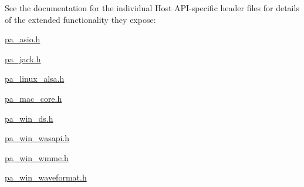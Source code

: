 See the documentation for the individual Host A\+P\+I-\/specific header files for details of the extended functionality they expose\+:


\begin{DoxyItemize}
\item \hyperlink{pa__asio_8h}{pa\+\_\+asio.\+h}
\item \hyperlink{pa__jack_8h}{pa\+\_\+jack.\+h}
\item \hyperlink{pa__linux__alsa_8h}{pa\+\_\+linux\+\_\+alsa.\+h}
\item \hyperlink{pa__mac__core_8h}{pa\+\_\+mac\+\_\+core.\+h}
\item \hyperlink{pa__win__ds_8h}{pa\+\_\+win\+\_\+ds.\+h}
\item \hyperlink{pa__win__wasapi_8h}{pa\+\_\+win\+\_\+wasapi.\+h}
\item \hyperlink{pa__win__wmme_8h}{pa\+\_\+win\+\_\+wmme.\+h}
\item \hyperlink{pa__win__waveformat_8h}{pa\+\_\+win\+\_\+waveformat.\+h} 
\end{DoxyItemize}